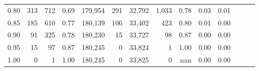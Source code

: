 \begin{tabular}{rrrrrrrrrrrrrr}
0.80 &     313 &    712 &  0.69 &  179,954 &      291 &  32,792 &   1,033 &  0.78 &  0.03 &      0.01 \\
0.85 &     185 &    610 &  0.77 &  180,139 &      106 &  33,402 &     423 &  0.80 &  0.01 &      0.00 \\
0.90 &      91 &    325 &  0.78 &  180,230 &       15 &  33,727 &      98 &  0.87 &  0.00 &      0.00 \\
0.95 &      15 &     97 &  0.87 &  180,245 &        0 &  33,824 &       1 &  1.00 &  0.00 &      0.00 \\
1.00 &       0 &      1 &  1.00 &  180,245 &        0 &  33,825 &       0 &   nan &  0.00 &      0.00 \\
\bottomrule
\end{tabular}
